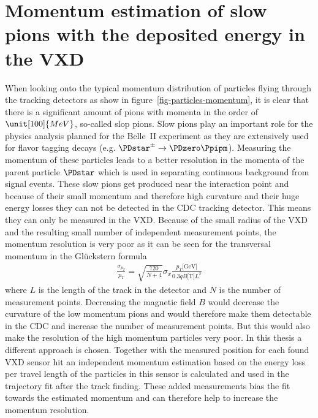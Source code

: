 \newcommand{\dedx}{$\mathrm d E / \mathrm d x$ }
\chapter{Momentum estimation of slow pions with the deposited energy in the VXD} \label{chapter-vxd}

When looking onto the typical momentum distribution of particles flying through the tracking detectors as show in figure~\ref{fig-particles-momentum}, it is clear that there is a significant amount of pions with momenta in the order of $\unit[100]{MeV}$, so-called slop pions. Slow pions play an important role for the physics analysis planned for the Belle~II experiment as they are extensively used for flavor tagging decays (e.g. $\PDstar^\pm \to \PDzero \Ppipm$). Measuring the momentum of these particles leads to a better resolution in the momenta of the parent particle $\PDstar$ which is used in separating continuous background from signal events. These slow pions get produced near the interaction point and because of their small momentum and therefore high curvature and their huge energy losses they can not be detected in the CDC tracking detector. This means they can only be measured in the VXD. Because of the small radius of the VXD and the resulting small number of independent measurement points, the momentum resolution is very poor as it can be seen for the transversal momentum in the Glückstern formula
\begin{align*}
 \frac{\sigma_{p_T}}{p_T} = \sqrt{\frac{720}{N + 4}} \sigma_x \frac{p_T \text{[GeV]}}{0.3 q B \text{[T]} L^2}
\end{align*}
where $L$ is the length of the track in the detector and $N$ is the number of measurement points. Decreasing the magnetic field $B$ would decrease the curvature of the low momentum pions and would therefore make them detectable in the CDC and increase the number of measurement points. But this would also make the resolution of the high momentum particles very poor. In this thesis a different approach is chosen. Together with the measured position for each found VXD sensor hit an independent momentum estimation based on the energy loss per travel length of the particles in this sensor is calculated and used in the trajectory fit after the track finding. These added measurements bias the fit towards the estimated momentum and can therefore help to increase the momentum resolution.

